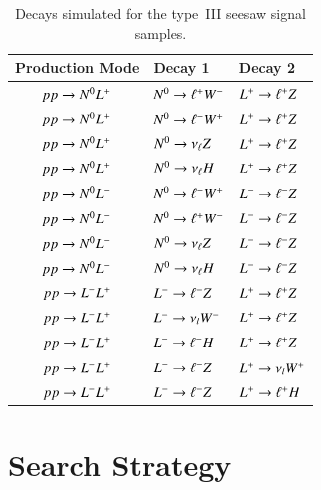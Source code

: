 \begin{table}
	\centering
	\begin{tabular}{c|ll}
		Production Mode & Decay 1 & Decay 2 \\
		\hline
		$pp \rightarrow N^{0}L^{+}$	&	$N^{0} \rightarrow \ell^{+} W^{-}$	&	$L^{+} \rightarrow \ell^{+} Z$ \\
		$pp \rightarrow N^{0}L^{+}$	&	$N^{0} \rightarrow \ell^{-} W^{+}$	&	$L^{+} \rightarrow \ell^{+} Z$ \\
		$pp \rightarrow N^{0}L^{+}$	&	$N^{0} \rightarrow \nu_{\ell} Z$		&	$L^{+} \rightarrow \ell^{+} Z$ \\
		$pp \rightarrow N^{0}L^{+}$	&	$N^{0} \rightarrow \nu_{\ell} H$		&	$L^{+} \rightarrow \ell^{+} Z$ \\
		$pp \rightarrow N^{0}L^{-}$	&	$N^{0} \rightarrow \ell^{-} W^{+}$	&	$L^{-} \rightarrow \ell^{-} Z$ \\
		$pp \rightarrow N^{0}L^{-}$	&	$N^{0} \rightarrow \ell^{+} W^{-}$	&	$L^{-} \rightarrow \ell^{-} Z$ \\
		$pp \rightarrow N^{0}L^{-}$	&	$N^{0} \rightarrow \nu_{\ell} Z$		&	$L^{-} \rightarrow \ell^{-} Z$ \\
		$pp \rightarrow N^{0}L^{-}$	&	$N^{0} \rightarrow \nu_{\ell} H$		&	$L^{-} \rightarrow \ell^{-} Z$ \\
		$pp \rightarrow L^{-}L^{+}$	&	$L^{-} \rightarrow \ell^{-} Z$		&	$L^{+} \rightarrow \ell^{+} Z$ \\
		$pp \rightarrow L^{-}L^{+}$	&	$L^{-} \rightarrow \nu_{l} W^{-}$	&	$L^{+} \rightarrow \ell^{+} Z$ \\
		$pp \rightarrow L^{-}L^{+}$	&	$L^{-} \rightarrow \ell^{-} H$		&	$L^{+} \rightarrow \ell^{+} Z$ \\
		$pp \rightarrow L^{-}L^{+}$	&	$L^{-} \rightarrow \ell^{-} Z$		&	$L^{+} \rightarrow \nu_{l} W^{+}$ \\
		$pp \rightarrow L^{-}L^{+}$	&	$L^{-} \rightarrow \ell^{-} Z$		&	$L^{+} \rightarrow \ell^{+} H$ \\
	\end{tabular}
	\caption{Decays simulated for the type~III seesaw signal samples.}
	\label{table:resonance-seesaw-sample-decays}
\end{table}



\section{Search Strategy}\label{sec:resonance-search-strategy}
